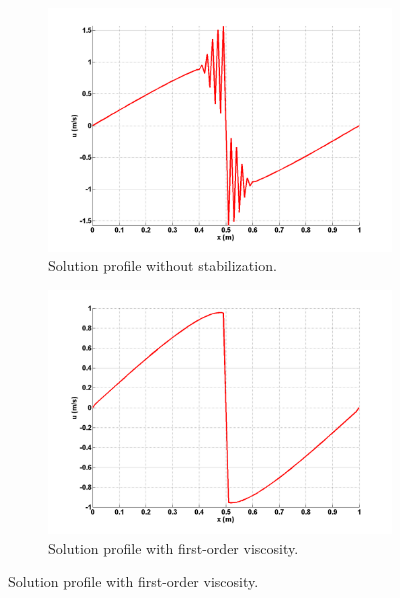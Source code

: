 \begin{figure}[H]
        \centering
        \begin{subfigure}[b]{0.495\textwidth}
                \centering
                \includegraphics[width=\textwidth]{figures/1D_sol_free.png}
                \caption{Solution profile without stabilization.}
                \label{fig:1d_burger_free}
        \end{subfigure}%
%
        \begin{subfigure}[b]{0.495\textwidth}
                \centering
                \includegraphics[width=\textwidth]{figures/1D_sol_fo.png}
                \caption{Solution profile with first-order viscosity.}
                \label{fig:1d_burger_fo}
        \end{subfigure}
        

\end{figure}
